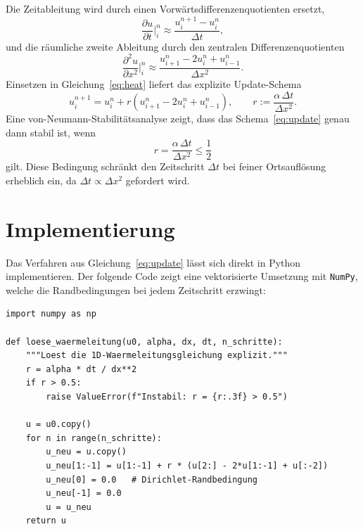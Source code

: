 \documentclass[11pt,a4paper]{article}
\begin{document}
Die Zeitableitung wird durch einen Vorwärtsdifferenzenquotienten ersetzt,
\begin{equation}
\frac{\partial u}{\partial t}\bigg|_{i}^{n} \approx \frac{u_i^{n+1} - u_i^n}{\Delta t},
\end{equation}
und die räumliche zweite Ableitung durch den zentralen Differenzenquotienten
\begin{equation}
\frac{\partial^2 u}{\partial x^2}\bigg|_{i}^{n} \approx \frac{u_{i+1}^n - 2 u_i^n + u_{i-1}^n}{\Delta x^2}.
\end{equation}
Einsetzen in Gleichung~\eqref{eq:heat} liefert das explizite Update-Schema
\begin{equation}
u_i^{n+1} = u_i^n + r \left( u_{i+1}^n - 2 u_i^n + u_{i-1}^n \right), \qquad
r := \frac{\alpha \, \Delta t}{\Delta x^2}.
\label{eq:update}
\end{equation}
Eine von-Neumann-Stabilitätsanalyse zeigt, dass das Schema~\eqref{eq:update} genau dann
stabil ist, wenn
\begin{equation}
r = \frac{\alpha \, \Delta t}{\Delta x^2} \leq \frac{1}{2}
\label{eq:stability}
\end{equation}
gilt. Diese Bedingung schränkt den Zeitschritt $\Delta t$ bei feiner Ortsauflösung
erheblich ein, da $\Delta t \propto \Delta x^2$ gefordert wird.

\section{Implementierung}
Das Verfahren aus Gleichung~\eqref{eq:update} lässt sich direkt in Python implementieren.
Der folgende Code zeigt eine vektorisierte Umsetzung mit \texttt{NumPy}, welche die
Randbedingungen bei jedem Zeitschritt erzwingt:

\begin{lstlisting}[caption={Explizites FTCS-Verfahren für die Wärmeleitungsgleichung}]
import numpy as np

def loese_waermeleitung(u0, alpha, dx, dt, n_schritte):
    """Loest die 1D-Waermeleitungsgleichung explizit."""
    r = alpha * dt / dx**2
    if r > 0.5:
        raise ValueError(f"Instabil: r = {r:.3f} > 0.5")

    u = u0.copy()
    for n in range(n_schritte):
        u_neu = u.copy()
        u_neu[1:-1] = u[1:-1] + r * (u[2:] - 2*u[1:-1] + u[:-2])
        u_neu[0] = 0.0   # Dirichlet-Randbedingung
        u_neu[-1] = 0.0
        u = u_neu
    return u
\end{lstlisting}
\end{document}
